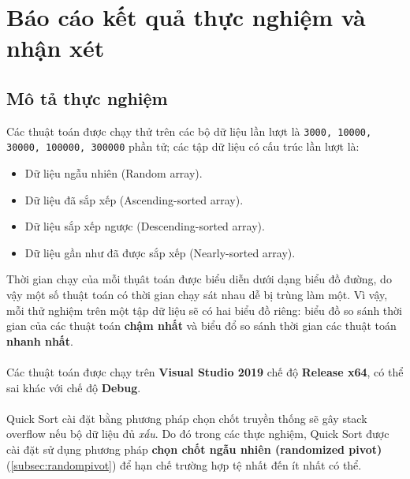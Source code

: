 \documentclass[]{article}
\begin{document}
\section{Báo cáo kết quả thực nghiệm và nhận xét}
\subsection{Mô tả thực nghiệm}
Các thuật toán được chạy thử trên các bộ dữ liệu lần lượt là \texttt{3000, 10000, 30000, 100000, 300000} phần tử; các tập dữ liệu có cấu trúc lần lượt là:
\begin{itemize}
\item Dữ liệu ngẫu nhiên (Random array).
\item Dữ liệu đã sắp xếp (Ascending-sorted array).
\item Dữ liệu sắp xếp ngược (Descending-sorted array).
\item Dữ liệu gần như đã được sắp xếp (Nearly-sorted array).
\end{itemize}
Thời gian chạy của mỗi thụât toán được biểu diễn dưới dạng biểu đồ đường, do vậy một số thuật toán có thời gian chạy sát nhau dễ bị trùng làm một. Vì vậy, mỗi thử nghiệm trên một tập dữ liệu sẽ có hai biểu đồ riêng: biểu đồ so sánh thời gian của các thuật toán \textbf{chậm nhất} và biểu đổ so sánh thời gian các thuật toán \textbf{nhanh nhất}.
\\\\
Các thuật toán được chạy trên \textbf{Visual Studio 2019} chế độ \textbf{Release x64}, có thể sai khác với chế độ \textbf{Debug}.
\\\\
Quick Sort cài đặt bằng phương pháp chọn chốt truyền thống sẽ gây stack overflow nếu bộ dữ liệu đủ \textit{xấu}. Do đó trong các thực nghiệm, Quick Sort được cài đặt sử dụng phương pháp \textbf{chọn chốt ngẫu nhiên (randomized pivot)} (\ref{subsec:randompivot}) để hạn chế trường hợp tệ nhất đến ít nhất có thể.
\end{document}
